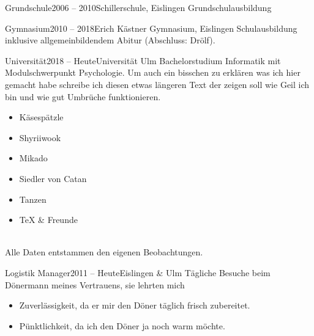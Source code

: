 \documentclass[german]{article}
\begin{document}
{{\begin{itemize}
\begin{event}{Grundschule}{2006 -- 2010}{Schillerschule, Eislingen}
        Grundschulausbildung
    \end{event}
    \begin{event}{Gymnasium}{2010 -- 2018}{Erich Kästner Gymnasium, Eislingen}
        Schulausbildung inklusive allgemeinbildendem Abitur (Abschluss: Drölf).
    \end{event}
    \begin{event}{Universität}{2018 -- Heute}{Universität Ulm}
        Bachelorstudium Informatik mit Modulschwerpunkt Psychologie. Um auch ein bisschen zu erklären was ich hier gemacht habe schreibe ich diesen etwas längeren Text der zeigen soll wie Geil ich bin und wie gut Umbrüche funktionieren.
    \end{event}
\end{itemize}}
\vfill{}%
\hskip-0.25cm\parbox{\linewidth-1cm+0.25cm}{\begin{multicols}{2}\vspace*{-\baselineskip}
    \begin{itemize}[topsep=0pt,label={\color{SignColor!75!black}\raisebox{0.5pt}{$\bullet$}},itemsep=2pt]
        \item Käsespätzle \hfill{}
        \item Shyriiwook \hfill{}
        \item Mikado \hfill{}
        \item Siedler von Catan \hfill{}
        \item Tanzen \hfill{}
        \item \TeX{} \& Freunde \hfill{}
    \end{itemize}
\end{multicols}\leavevmode{}\\[-1.5\baselineskip]\hbox{}\hfill Alle Daten entstammen den eigenen Beobachtungen.\smallskip}
\vfill{}
\hskip-0.25cm\parbox{\linewidth+0.25cm}{\begin{itemize}
\begin{event}{Logistik Manager}{2011 -- Heute}{Eislingen \& Ulm}
    Tägliche Besuche beim Dönermann meines Vertrauens, sie lehrten mich \begin{itemize}[label={\color{SignColor!25!black}\raisebox{0.75pt}{\scriptsize$\bullet$}},topsep=4pt,itemsep=2pt]
        \item Zuverlässigkeit, da er mir den Döner täglich frisch zubereitet.
        \item Pünktlichkeit, da ich den Döner ja noch warm möchte.

\end{itemize}
\end{event}
\end{itemize}}}
\end{document}
